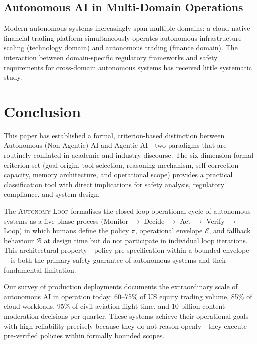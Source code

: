 \documentclass[12pt, a4paper]{article}
\begin{document}
\subsection{Autonomous AI in Multi-Domain Operations}
Modern autonomous systems increasingly span multiple domains: a cloud-native financial trading platform simultaneously operates autonomous infrastructure scaling (technology domain) and autonomous trading (finance domain). The interaction between domain-specific regulatory frameworks and safety requirements for cross-domain autonomous systems has received little systematic study.

\section{Conclusion}\label{sec:conclusion}

This paper has established a formal, criterion-based distinction between Autonomous (Non-Agentic) AI and Agentic AI---two paradigms that are routinely conflated in academic and industry discourse. The six-dimension formal criterion set (goal origin, tool selection, reasoning mechanism, self-correction capacity, memory architecture, and operational scope) provides a practical classification tool with direct implications for safety analysis, regulatory compliance, and system design.

The \textsc{Autonomy Loop} formalises the closed-loop operational cycle of autonomous systems as a five-phase process (Monitor $\to$ Decide $\to$ Act $\to$ Verify $\to$ Loop) in which humans define the policy $\pi$, operational envelope $\mathcal{E}$, and fallback behaviour $\mathcal{B}$ at design time but do not participate in individual loop iterations. This architectural property---policy pre-specification within a bounded envelope---is both the primary safety guarantee of autonomous systems and their fundamental limitation.

Our survey of production deployments documents the extraordinary scale of autonomous AI in operation today: 60--75\% of US equity trading volume, 85\% of cloud workloads, 95\% of civil aviation flight time, and 10 billion content moderation decisions per quarter. These systems achieve their operational goals with high reliability precisely because they do not reason openly---they execute pre-verified policies within formally bounded scopes.
\end{document}

